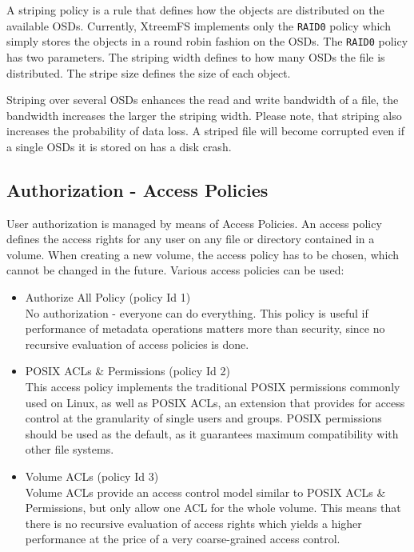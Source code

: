 \documentclass[a4paper,10pt]{book}
\begin{document}
A striping policy is a rule that defines how the objects are distributed on the available OSDs. Currently, XtreemFS implements only the \texttt{RAID0} policy which simply stores the objects in a round robin fashion on the OSDs. The \texttt{RAID0} policy has two parameters. The striping width defines to how many OSDs the file is distributed. The stripe size defines the size of each object.

Striping over several OSDs enhances the read and write bandwidth of a file, the bandwidth increases the larger the striping width. Please note, that striping also increases the probability of data loss. A striped file will become corrupted even if a single OSDs it is stored on has a disk crash.

\subsection{Authorization - Access Policies} \label{sec:access_policies}

User authorization is managed by means of Access Policies. An access policy defines the access rights for any user on any file or directory contained in a volume. When creating a new volume, the access policy has to be chosen, which cannot be changed in the future. Various access policies can be used: 

\begin{itemize}
 \item Authorize All Policy (policy Id 1)\\
No authorization - everyone can do everything. This policy is useful if performance of metadata operations matters more than security, since no recursive evaluation of access policies is done.

 \item POSIX ACLs \& Permissions (policy Id 2)\\
This access policy implements the traditional POSIX permissions commonly used on Linux, as well as POSIX ACLs, an extension that provides for access control at the granularity of single users and groups. POSIX permissions should be used as the default, as it guarantees maximum compatibility with other file systems.

 \item Volume ACLs (policy Id 3)\\
Volume ACLs provide an access control model similar to POSIX ACLs \& Permissions, but only allow one ACL for the whole volume. This means that there is no recursive evaluation of access rights which yields a higher performance at the price of a very coarse-grained access control. 
\end{itemize}
\end{document}
